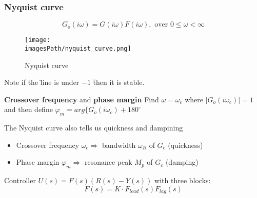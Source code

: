 \documentclass{article}
\newcommand{\imagesPath}{images}
\begin{document}
\subsubsection{Nyquist curve}
\begin{equation*}
    G_o(i\omega) = G(i\omega)F(i\omega), \text{ over } 0 \leq \omega < \infty
\end{equation*}


\begin{figure}[!h]
    \centering
    \texttt{[image: \\imagesPath/nyquist\_curve.png]}
    \caption{Nyquist curve}
    \label{fig:nyquist_curve}
\end{figure}
Note if the \" line is under $-1$ \" then it is stable.
\begin{definitionblock}{\textbf{Crossover frequency} and \textbf{phase margin}}
   Find $\omega = \omega_c$ where $|G_o(i\omega_c)| = 1$ and then define \newline
   $\varphi_m = arg\{ G_o(i\omega_c) + 180^{\circ}$
\end{definitionblock}

The Nyquist curve also tells us quickness and dampining
\begin{itemize}
    \item Crossover frequency $\omega_c \Rightarrow$ bandwidth $\omega_B$ of $G_c$ (quickness)
    \item Phase margin $\varphi_m \Rightarrow$ resonance peak $M_p$ of $G_c$ (damping)
\end{itemize}

Controller $U(s) = F(s)(R(s)-Y(s))$ with three blocks:
\begin{equation*}
    F(s) = K\cdot F_{lead}(s) F_{lag}(s)
\end{equation*}

\end{document}
